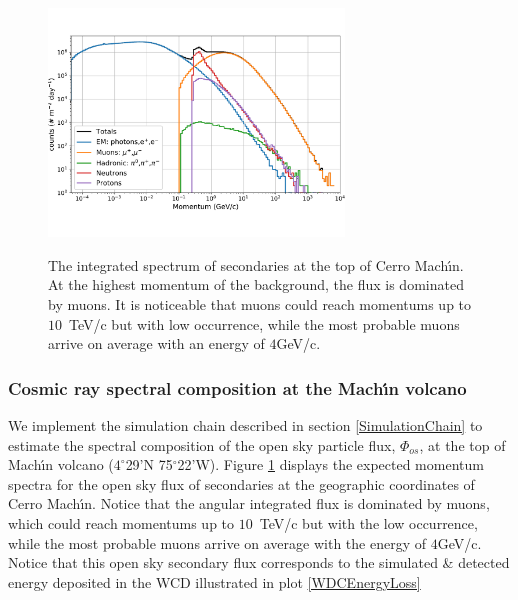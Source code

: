 \documentclass[letterpaper,10pt,titlepage,linenumber]{article}
\begin{document}
\begin{figure}
\centering
{\includegraphics[width=0.7\textwidth]{Figures/countsenergies}}
	\caption{The integrated spectrum of secondaries at the top of Cerro Mach\'{\i}n. At the highest momentum of the background, the flux is dominated by muons. It is noticeable that muons could reach momentums up to $10$\, TeV/c but with low occurrence, while the most probable muons arrive on average with an energy of $4$GeV/c.}
  \label{SpectralParticleComposition}
\end{figure}

\subsubsection{Cosmic ray spectral composition at the Mach\'{\i}n volcano}
We implement the simulation chain described in section \ref{SimulationChain} to estimate the spectral composition of the open sky particle flux, $\Phi_{os}$, at the top of Mach\'{\i}n volcano ($4^{\circ}$29'N 75$^{\circ}$22'W). Figure \ref{SpectralParticleComposition} displays the expected momentum spectra for the open sky flux of secondaries at the geographic coordinates of Cerro Mach\'{\i}n. Notice that the angular integrated flux is dominated by muons, which could reach momentums up to $10$\, TeV/c but with the low occurrence, while the most probable muons arrive on average with the energy of $4$GeV/c. Notice that this open sky secondary flux corresponds to the simulated \& detected energy deposited in the WCD illustrated in plot  \ref{WDCEnergyLoss}
\end{document}
